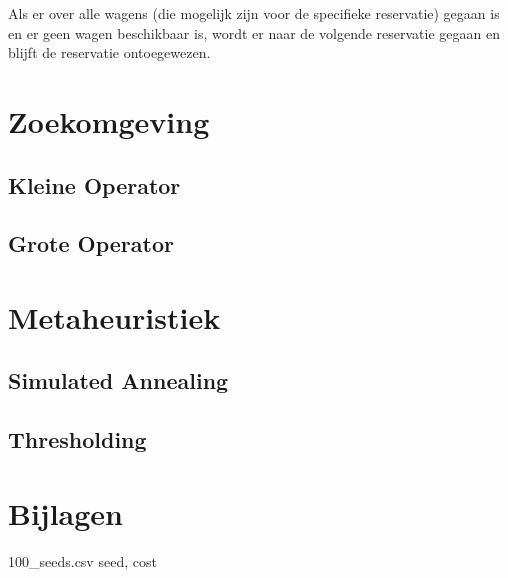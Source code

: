 \documentclass[a4paper, 12pt, one column]{article}
\begin{document}
Als er over alle wagens (die mogelijk zijn voor de specifieke reservatie) gegaan is en er geen wagen beschikbaar is, wordt er naar de volgende reservatie gegaan en blijft de reservatie ontoegewezen.

\section{Zoekomgeving}

\subsection{Kleine Operator}

\subsection{Grote Operator}

\section{Metaheuristiek}
\subsection{Simulated Annealing}

\subsection{Thresholding}

\section{Bijlagen}
\begin{filecontents*}{100_seeds.csv}
seed, cost
\end{filecontents*}

\end{document}

